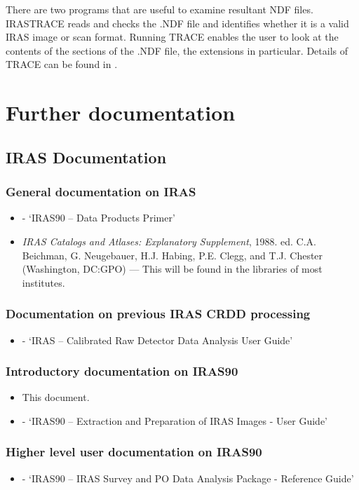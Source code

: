 There are two programs that are useful to examine resultant NDF files.
IRASTRACE reads and checks the .NDF file and identifies whether it is a valid
IRAS image or scan format. Running TRACE enables  the user to look at the
contents of the sections of the .NDF file, the extensions in particular. Details
of TRACE can be found in .

\section{Further documentation
\label{a:docs}}

\subsection{IRAS Documentation}
\subsubsection {General documentation on IRAS}
\begin{itemize}
\item {\bf {}} - `IRAS90 -- Data Products Primer' 
\item {\em IRAS Catalogs and Atlases: Explanatory Supplement}, 1988. ed. C.A. 
Beichman, G. Neugebauer, H.J. Habing, P.E. Clegg, and T.J. Chester (Washington,
DC:GPO) --- This will be found in the libraries of most institutes.
\end{itemize}
\subsubsection {Documentation on previous IRAS CRDD processing}
\begin{itemize}
\item {\bf {}} - `IRAS -- Calibrated Raw Detector Data
Analysis User Guide'
\end{itemize}
\subsubsection {Introductory documentation on IRAS90}
\begin{itemize}
\item This document.
\item {\bf {}} - `IRAS90 -- Extraction and Preparation 
of IRAS Images - User Guide'
\end{itemize}
\subsubsection {Higher level user documentation on IRAS90}
\begin{itemize}
\item {\bf {}} - `IRAS90 -- IRAS Survey and PO Data
Analysis Package - Reference Guide'
\end{itemize}
